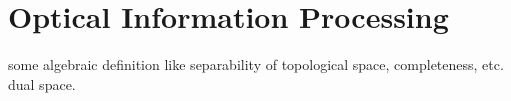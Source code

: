 \chapter{Optical Information Processing}
some algebraic definition like separability of topological space, completeness, etc. dual space. 
